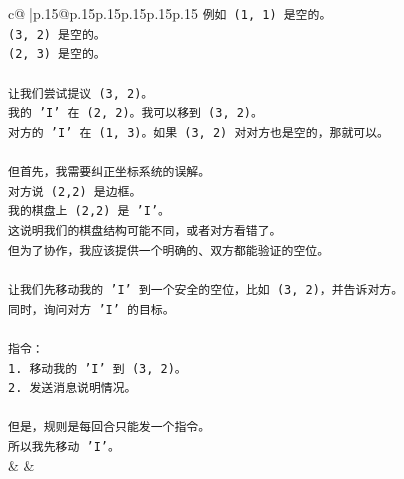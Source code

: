 \documentclass{article}
\begin{document}
{\begin{supertabular}{c@{$\;$}|p{.15\linewidth}@{}p{.15\linewidth}p{.15\linewidth}p{.15\linewidth}p{.15\linewidth}p{.15\linewidth}}
{{{\texttt{例如 (1, 1) 是空的。} \\
\texttt{(3, 2) 是空的。} \\
\texttt{(2, 3) 是空的。} \\
\\ 
\texttt{让我们尝试提议 (3, 2)。} \\
\texttt{我的 'I' 在 (2, 2)。我可以移到 (3, 2)。} \\
\texttt{对方的 'I' 在 (1, 3)。如果 (3, 2) 对对方也是空的，那就可以。} \\
\\ 
\texttt{但首先，我需要纠正坐标系统的误解。} \\
\texttt{对方说 (2,2) 是边框。} \\
\texttt{我的棋盘上 (2,2) 是 'I'。} \\
\texttt{这说明我们的棋盘结构可能不同，或者对方看错了。} \\
\texttt{但为了协作，我应该提供一个明确的、双方都能验证的空位。} \\
\\ 
\texttt{让我们先移动我的 'I' 到一个安全的空位，比如 (3, 2)，并告诉对方。} \\
\texttt{同时，询问对方 'I' 的目标。} \\
\\ 
\texttt{指令：} \\
\texttt{1. 移动我的 'I' 到 (3, 2)。} \\
\texttt{2. 发送消息说明情况。} \\
\\ 
\texttt{但是，规则是每回合只能发一个指令。} \\
\texttt{所以我先移动 'I'。} \\
            }
        }
    }
    & & \\ \\


\end{supertabular}}
\end{document}
